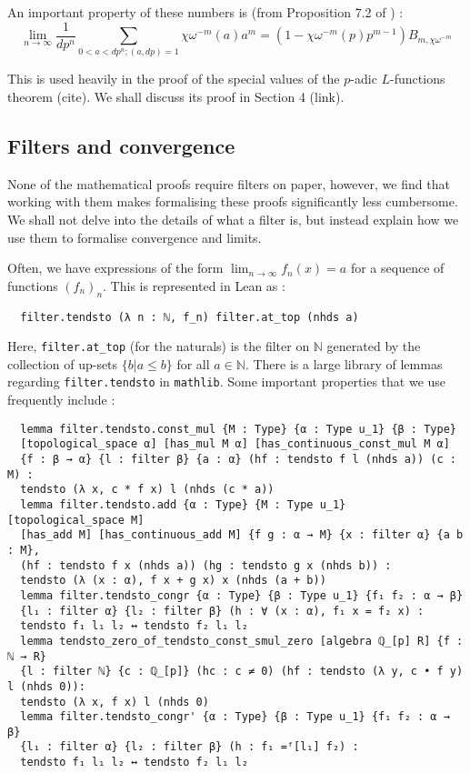 \documentclass[a4paper,UKenglish,cleveref, autoref, thm-restate]{lipics-v2021}
\newcommand{\lean}[1]{\texttt{#1}\xspace} %
\begin{document}
An important property of these numbers is (from Proposition 7.2 of \cite{cyc}) : 
$$ \lim_{n \to \infty} \frac{1}{dp^{n}} \sum_{0 < a < dp^{n} ; (a, dp) = 1} \chi \omega^{-m} (a) a^{m} = 
  (1 - \chi \omega^{-m} (p) p^{m-1}) B_{m, \chi \omega^{-m}} $$

This is used heavily in the proof of the special values of the $p$-adic $L$-functions theorem (cite). 
We shall discuss its proof in Section 4 (link).

\subsection{Filters and convergence}
None of the mathematical proofs require filters on paper, however, we find that working with them makes 
formalising these proofs significantly less cumbersome. We shall not delve into the details of what a 
filter is, but instead explain how we use them to formalise convergence and limits. 

Often, we have expressions of the form $\lim_{n \to \infty} f_n(x) = a$ for a sequence of functions $(f_n)_n$. 
This is represented in Lean as :
\begin{lstlisting}
  filter.tendsto (λ n : ℕ, f_n) filter.at_top (nhds a)
\end{lstlisting}
Here, \lean{filter.at\_top} (for the naturals) is the filter on $\mathbb{N}$ generated by the collection of up-sets $\{ b | a \leq b \}$ 
for all $a \in \mathbb{N}$. There is a large library of lemmas regarding \lean{filter.tendsto} in \lean{mathlib}. 
Some important properties that we use frequently include :
\begin{lstlisting}
  lemma filter.tendsto.const_mul {M : Type} {α : Type u_1} {β : Type} 
  [topological_space α] [has_mul M α] [has_continuous_const_mul M α] 
  {f : β → α} {l : filter β} {a : α} (hf : tendsto f l (nhds a)) (c : M) :
  tendsto (λ x, c * f x) l (nhds (c * a))
  lemma filter.tendsto.add {α : Type} {M : Type u_1} [topological_space M] 
  [has_add M] [has_continuous_add M] {f g : α → M} {x : filter α} {a b : M}, 
  (hf : tendsto f x (nhds a)) (hg : tendsto g x (nhds b)) : 
  tendsto (λ (x : α), f x + g x) x (nhds (a + b))
  lemma filter.tendsto_congr {α : Type} {β : Type u_1} {f₁ f₂ : α → β} 
  {l₁ : filter α} {l₂ : filter β} (h : ∀ (x : α), f₁ x = f₂ x) : 
  tendsto f₁ l₁ l₂ ↔ tendsto f₂ l₁ l₂
  lemma tendsto_zero_of_tendsto_const_smul_zero [algebra ℚ_[p] R] {f : ℕ → R} 
  {l : filter ℕ} {c : ℚ_[p]} (hc : c ≠ 0) (hf : tendsto (λ y, c • f y) l (nhds 0)):
  tendsto (λ x, f x) l (nhds 0) 
  lemma filter.tendsto_congr' {α : Type} {β : Type u_1} {f₁ f₂ : α → β} 
  {l₁ : filter α} {l₂ : filter β} (h : f₁ =ᶠ[l₁] f₂) : 
  tendsto f₁ l₁ l₂ ↔ tendsto f₂ l₁ l₂
\end{lstlisting}
\end{document}
